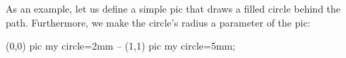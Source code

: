 As an example, let us define a simple pic that draws a filled circle behind the
path. Furthermore, we make the circle's radius a parameter of the pic:
%
\begin{codeexample}[]
\tikz [fill=blue!30]
  \draw (0,0) pic {my circle=2mm} -- (1,1) pic {my circle=5mm};
\end{codeexample}
